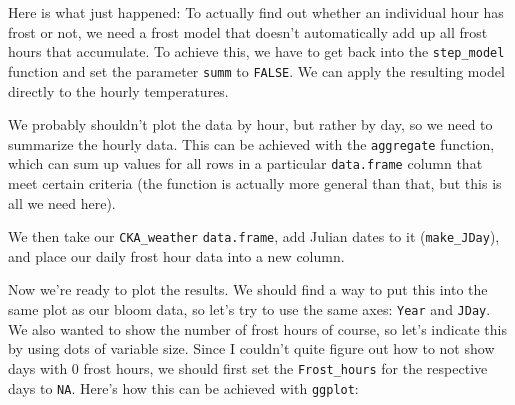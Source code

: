 \documentclass[
]{book}
\newenvironment{Shaded}{\begin{snugshade}}{\end{snugshade}}
\newcommand{\ControlFlowTok}[1]{\textcolor[rgb]{0.13,0.29,0.53}{\textbf{#1}}}
\newcommand{\DataTypeTok}[1]{\textcolor[rgb]{0.13,0.29,0.53}{#1}}
\newcommand{\KeywordTok}[1]{\textcolor[rgb]{0.13,0.29,0.53}{\textbf{#1}}}
\newcommand{\NormalTok}[1]{#1}
\newcommand{\OperatorTok}[1]{\textcolor[rgb]{0.81,0.36,0.00}{\textbf{#1}}}
\newcommand{\OtherTok}[1]{\textcolor[rgb]{0.56,0.35,0.01}{#1}}
\newcommand{\StringTok}[1]{\textcolor[rgb]{0.31,0.60,0.02}{#1}}
\begin{document}
\begin{Shaded}
\end{Shaded}

Here is what just happened: To actually find out whether an individual hour has frost or not, we need a frost model that doesn't automatically add up all frost hours that accumulate. To achieve this, we have to get back into the \texttt{step\_model} function and set the parameter \texttt{summ} to \texttt{FALSE}. We can apply the resulting model directly to the hourly temperatures.

We probably shouldn't plot the data by hour, but rather by day, so we need to summarize the hourly data. This can be achieved with the \texttt{aggregate} function, which can sum up values for all rows in a particular \texttt{data.frame} column that meet certain criteria (the function is actually more general than that, but this is all we need here).

We then take our \texttt{CKA\_weather} \texttt{data.frame}, add Julian dates to it (\texttt{make\_JDay}), and place our daily frost hour data into a new column.

Now we're ready to plot the results. We should find a way to put this into the same plot as our bloom data, so let's try to use the same axes: \texttt{Year} and \texttt{JDay}. We also wanted to show the number of frost hours of course, so let's indicate this by using dots of variable size. Since I couldn't quite figure out how to not show days with 0 frost hours, we should first set the \texttt{Frost\_hours} for the respective days to \texttt{NA}. Here's how this can be achieved with \texttt{ggplot}:
\end{document}
